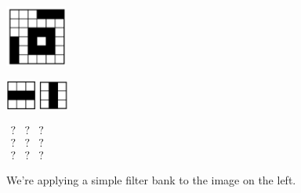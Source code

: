         \begin{figure}[H]
            \centering
            \begin{minipage}{.2\textwidth}
                \includegraphics[width=20mm,scale=0.5]{images/convolutional_neural_networks_images/input_image.png}
            \end{minipage}
            \begin{minipage}{.2\textwidth}
                \centering
                \includegraphics[width=10mm]{images/convolutional_neural_networks_images/horizontal_filter.png}
                \includegraphics[width=10mm]{images/convolutional_neural_networks_images/vertical_filter.png}
                \caption*{$\mathlarger{
            \mathlarger{\mathlarger{\mathlarger{\mathlarger{\implies}}}}}$}
            \end{minipage}
            \begin{minipage}{.2\textwidth}
            \qquad
                $\begin{matrix}
                    ? & ? & ?  \\
                    ? & ? & ?  \\
                    ? & ? & ?  
                \end{matrix}$
            \end{minipage}
            \caption*{We're applying a simple filter bank to the image on the left.}
        \end{figure}

